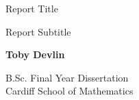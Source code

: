 \begin{titlepage}
    \begin{center}
        \vspace*{5cm}

		Report Title 

        \vspace{0.5cm}
        Report Subtitle

        \vspace{1.5cm}\textit{}

        \textbf{Toby Devlin}
        \vfill

        B.Sc. Final Year Dissertation\\

        \vspace{0.5cm}
        Cardiff School of Mathematics

        \vspace{1.5cm}



    \end{center}
\end{titlepage}